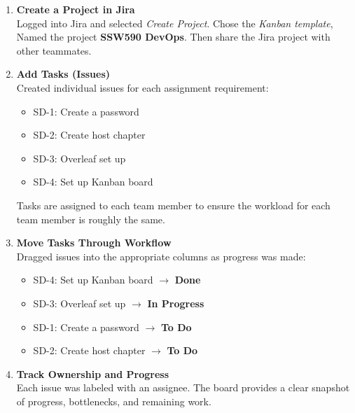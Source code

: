 \begin{enumerate}
    \item \textbf{Create a Project in Jira} \\
    Logged into Jira and selected \textit{Create Project}. 
    Chose the \textit{Kanban template},
    Named the project \textbf{SSW590 DevOps}. Then share the Jira project with other teammates. 

    \item \textbf{Add Tasks (Issues)} \\
    Created individual issues for each assignment requirement:
    \begin{itemize}
        \item SD-1: Create a password
        \item SD-2: Create host chapter
        \item SD-3: Overleaf set up
        \item SD-4: Set up Kanban board
    \end{itemize}
    Tasks are assigned to each team member to ensure the workload for each team member is roughly the same.

    \item \textbf{Move Tasks Through Workflow} \\
    Dragged issues into the appropriate columns as progress was made:
    \begin{itemize}
        \item SD-4: Set up Kanban board $\rightarrow$ \textbf{Done}
        \item SD-3: Overleaf set up $\rightarrow$ \textbf{In Progress}
        \item SD-1: Create a password $\rightarrow$ \textbf{To Do}
        \item SD-2: Create host chapter $\rightarrow$ \textbf{To Do}
    \end{itemize}

    \item \textbf{Track Ownership and Progress} \\
    Each issue was labeled with an assignee.
    The board provides a clear snapshot of progress, bottlenecks, and remaining work.

\end{enumerate}